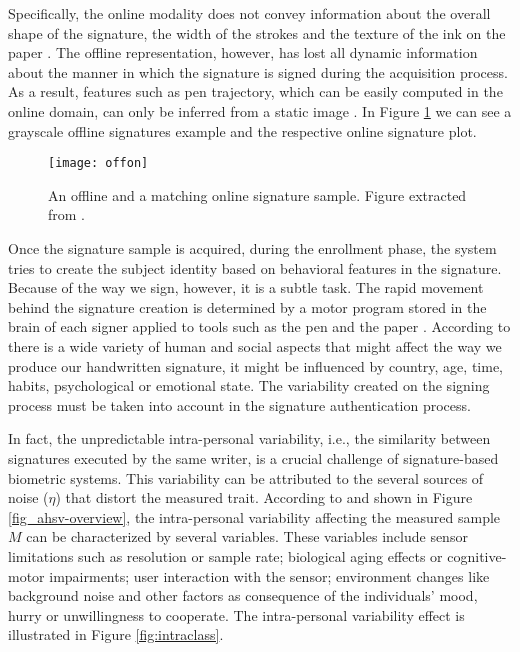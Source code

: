 Specifically, the online modality does not convey information about the overall shape of the signature, the width of the strokes and the texture of the ink on the paper \cite{diaz2014generation}. The offline representation, however, has lost all dynamic information about the manner in which the signature is signed during the acquisition process. As a result, features such as pen trajectory, which can be easily computed in the online domain, can only be inferred from a static image \cite{nel2005estimating}. In Figure \ref{fig:offon} we can see a grayscale offline signatures example and the respective online signature plot. 

\begin{figure}[!htb]
\centering
\texttt{[image: offon]}
\caption{An offline and a matching online signature sample. Figure extracted from \cite{sigcomp2009}.}
\label{fig:offon}
\end{figure}

Once the signature sample is acquired, during the enrollment phase, the system tries to create the subject identity based on behavioral features in the signature. Because of the way we sign, however, it is a subtle task. The rapid movement behind the signature creation is determined by a motor program stored in the brain of each signer applied to tools such as the pen and the paper \cite{pirlo2014advances}. According to \cite{plamondon1989automatic} there is a wide variety of human and social aspects that might affect the way we produce our handwritten signature, it might be influenced by country, age, time, habits, psychological or emotional state. The variability created on the signing process must be taken into account in the signature authentication process.

In fact, the unpredictable intra-personal variability, i.e., the similarity between signatures executed by the same writer, is a crucial challenge of signature-based biometric systems. This variability can be attributed to the several sources of noise ($\eta$) that distort the measured trait. According to \cite{jain2016} and shown in Figure \ref{fig_ahsv-overview}, the intra-personal variability affecting the measured sample {\boldm $M$} can be characterized by several variables. These variables include sensor limitations such as resolution or sample rate; biological aging effects or cognitive-motor impairments; user interaction with the sensor; environment changes like background noise and other factors as consequence of the individuals’ mood, hurry or unwillingness to cooperate. The intra-personal variability effect is illustrated in Figure \ref{fig:intraclass}.


